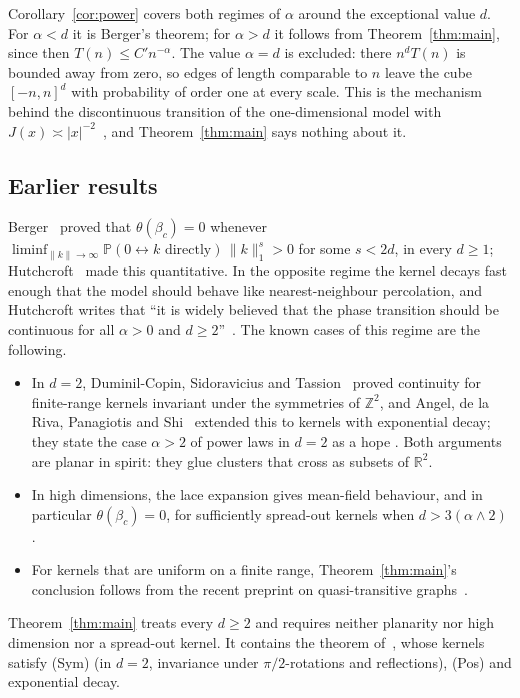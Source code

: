 \documentclass[11pt]{article}
\theoremstyle{definition}
\theoremstyle{remark}
\numberwithin{equation}{section}
\newcommand{\Z}{\mathbb Z}
\newcommand{\R}{\mathbb R}
\newcommand{\Pp}{\mathbb P}
\newcommand{\1}{\mathbf 1}
\newcommand{\lr}{\leftrightarrow}
\newcommand{\norm}[1]{\|#1\|}
\begin{document}
Corollary~\ref{cor:power} covers both regimes of $\alpha$ around the exceptional value $d$. For
$\alpha<d$ it is Berger's theorem; for $\alpha>d$ it follows from Theorem~\ref{thm:main}, since
then $T(n)\le C'n^{-\alpha}$. The value $\alpha=d$ is excluded: there $n^dT(n)$ is bounded away
from zero, so edges of length comparable to $n$ leave the cube $[-n,n]^d$ with probability of
order one at every scale. This is the mechanism behind the discontinuous transition of the
one-dimensional model with $J(x)\asymp|x|^{-2}$~\cite{AizenmanNewman1986,DuminilCopinGarbanTassion2020},
and Theorem~\ref{thm:main} says nothing about it.

\subsection{Earlier results}

Berger~\cite[Theorem~2.6]{Berger2002} proved that $\theta(\beta_c)=0$ whenever
$\liminf_{\norm{k}\to\infty}\Pp(0\lr k\text{ directly})\,\norm{k}_1^{s}>0$ for some $s<2d$, in every
$d\ge1$; Hutchcroft~\cite{Hutchcroft2021} made this quantitative. In the opposite regime the
kernel decays fast enough that the model should behave like nearest-neighbour percolation, and
Hutchcroft writes that ``it is widely believed that the phase transition should be continuous for
all $\alpha>0$ and $d\ge2$''~\cite[p.~2]{Hutchcroft2021}. The known cases of this regime are the
following.
\begin{itemize}
\item In $d=2$, Duminil-Copin, Sidoravicius and Tassion~\cite{DuminilCopinSidoraviciusTassion2016}
proved continuity for finite-range kernels invariant under the symmetries of $\Z^2$, and
Angel, de la Riva, Panagiotis and Shi~\cite{AngelEtAl2026} extended this to kernels with
exponential decay; they state the case $\alpha>2$ of power laws in $d=2$ as a hope
\cite[\S1.4]{AngelEtAl2026}. Both arguments are planar in spirit: they glue clusters that cross
as subsets of $\R^2$.
\item In high dimensions, the lace expansion gives mean-field behaviour, and in particular
$\theta(\beta_c)=0$, for sufficiently spread-out kernels when $d>3(\alpha\wedge2)$
\cite{HeydenreichHofstadSakai2008}.
\item For kernels that are uniform on a finite range, Theorem~\ref{thm:main}'s conclusion follows
from the recent preprint on quasi-transitive graphs~\cite{OpenAIQT}.
\end{itemize}
Theorem~\ref{thm:main} treats every $d\ge2$ and requires neither planarity nor high dimension
nor a spread-out kernel. It contains the theorem of~\cite{AngelEtAl2026}, whose kernels satisfy
(Sym) (in $d=2$, invariance under $\pi/2$-rotations and reflections), (Pos) and exponential decay.
\end{document}
